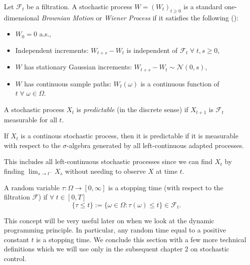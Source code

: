 \begin{definition}
    Let $\mathcal{F}_t$ be a filtration. A stochastic process $W=(W_t)_{t\geq0}$
    is a standard one-dimensional \emph{Brownian Motion} or \emph{Wiener Process}
    if it satisfies the following (\cite{BMSC}):
    \begin{itemize}
        \item $W_0=0$ a.s.,
        \item Independent increments: $W_{t+s}-W_t$ is independent of $\mathcal{F}_t\;\forall\;t,s\geq0$,
        \item $W$ has stationary Gaussian increments: $W_{t+s}-W_t\sim\mathcal{N}(0,s)$,
        \item $W$ has continuous sample paths: $W_t(\omega)$ is a continuous function of $t\;\forall\;\omega\in\Omega$.
    \end{itemize}
\end{definition}

\begin{definition}
    A stochastic process $X_t$ is \emph{predictable} (in the discrete sense) 
    if $X_{t+1}$ is $\mathcal{F}_{t}$ measurable for all $t$. 
    
    If $X_t$ is a continous stochastic process, then it is predictable if it is 
    measurable with respect to the $\sigma$-algebra generated by all left-continuous
    adapted processes. 
    
    This includes all left-continuous stochastic processes
    since we can find $X_t$ by finding $\lim_{s\rightarrow t^-}X_s$ without needing 
    to observe $X$ at time $t$.
\end{definition}

\begin{definition}
    A random variable $\tau:\Omega\rightarrow[0,\infty]$ is a stopping time (with
    respect to the filtration $\mathcal{F}$) if $\forall\;t\in[0,T]$
    \begin{equation*}
        \{\tau\leq t\}:=\{\omega\in\Omega:\tau(\omega)\leq t\}\in\mathcal{F}_t.
    \end{equation*}
\end{definition}

This concept will be very useful later on when we look at the dynamic programming 
principle. In particular, any random time equal to a positive constant $t$ is a 
stopping time. We conclude this section with a few more technical definitions which 
we will use only in the subsequent chapter 2 on stochastic control.

